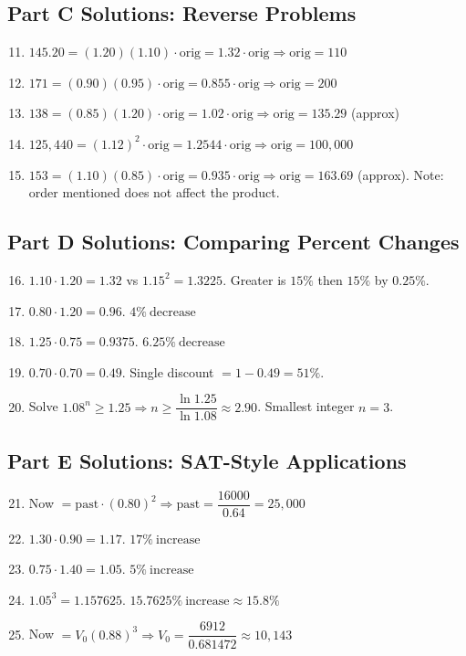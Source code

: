 \documentclass[14pt]{extarticle}
\begin{document}
\subsection*{Part C Solutions: Reverse Problems}
\begin{enumerate}
  \setcounter{enumi}{10}
  \item \(145.20=(1.20)(1.10)\cdot \text{orig}=1.32\cdot \text{orig}\Rightarrow \text{orig}=\boxed{110}\)
  \item \(171=(0.90)(0.95)\cdot \text{orig}=0.855\cdot \text{orig}\Rightarrow \text{orig}=\boxed{200}\)
  \item \(138=(0.85)(1.20)\cdot \text{orig}=1.02\cdot \text{orig}\Rightarrow \text{orig}=\boxed{135.29}\) (approx)
  \item \(125{,}440=(1.12)^2\cdot \text{orig}=1.2544\cdot \text{orig}\Rightarrow \text{orig}=\boxed{100{,}000}\)
  \item \(153=(1.10)(0.85)\cdot \text{orig}=0.935\cdot \text{orig}\Rightarrow \text{orig}=\boxed{163.69}\) (approx). Note: order mentioned does not affect the product.
\end{enumerate}

\subsection*{Part D Solutions: Comparing Percent Changes}
\begin{enumerate}
  \setcounter{enumi}{15}
  \item \(1.10\cdot1.20=1.32\) vs \(1.15^2=1.3225\). Greater is \(15\%\) then \(15\%\) by \(0.25\%\).
  \item \(0.80\cdot1.20=0.96\). \(\boxed{4\%\ \text{decrease}}\)
  \item \(1.25\cdot0.75=0.9375\). \(\boxed{6.25\%\ \text{decrease}}\)
  \item \(0.70\cdot0.70=0.49\). Single discount \(=1-0.49=\boxed{51\%}\).
  \item Solve \(1.08^n\ge1.25\Rightarrow n\ge \dfrac{\ln 1.25}{\ln 1.08}\approx 2.90\). Smallest integer \(n=\boxed{3}\).
\end{enumerate}

\subsection*{Part E Solutions: SAT-Style Applications}
\begin{enumerate}
  \setcounter{enumi}{20}
  \item Now \(= \text{past}\cdot(0.80)^2\Rightarrow \text{past}=\dfrac{16000}{0.64}=\boxed{25{,}000}\)
  \item \(1.30\cdot0.90=1.17\). \(\boxed{17\%\ \text{increase}}\)
  \item \(0.75\cdot1.40=1.05\). \(\boxed{5\%\ \text{increase}}\)
  \item \(1.05^3=1.157625\). \(\boxed{15.7625\%\ \text{increase}}\approx \boxed{15.8\%}\)
  \item Now \(= V_0(0.88)^3\Rightarrow V_0=\dfrac{6912}{0.681472}\approx \boxed{10{,}143}\)
\end{enumerate}




\end{document}
